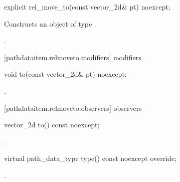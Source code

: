 \begin{itemdecl}
    explicit rel_move_to(const vector_2d& pt) noexcept;
\end{itemdecl}
\begin{itemdescr}
	\pnum
	\effects
	Constructs an object of type .
	
	\pnum
	\postconditions
	.
\end{itemdescr}

 [pathdataitem.relmoveto.modifiers]{ modifiers}

\begin{itemdecl}
    void to(const vector_2d& pt) noexcept;
\end{itemdecl}
\begin{itemdescr}
	\pnum
	\postconditions
	.
\end{itemdescr}

 [pathdataitem.relmoveto.observers]{ observers}

\begin{itemdecl}
    vector_2d to() const noexcept;
\end{itemdecl}
\begin{itemdescr}
	\pnum
	\returns
	.
\end{itemdescr}

\begin{itemdecl}
    virtual path_data_type type() const noexcept override;
\end{itemdecl}
\begin{itemdescr}
	\pnum
	\returns
	.
\end{itemdescr}
